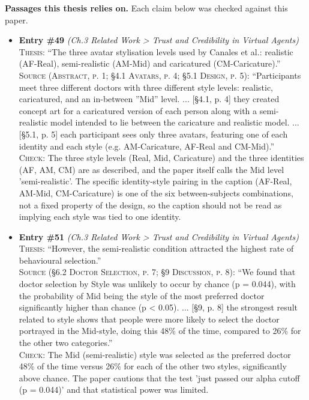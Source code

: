 \documentclass[11pt, a4paper]{article}
\begin{document}
\textbf{Passages this thesis relies on.} Each claim below was checked against this paper.
\begin{itemize}[leftmargin=1.2em,itemsep=4pt]
\item \textbf{Entry \#49} \textit{(Ch.3 Related Work > Trust and Credibility in Virtual Agents)}\\
\textsc{Thesis:} ``The three avatar stylisation levels used by Canales et al.: realistic (AF-Real), semi-realistic (AM-Mid) and caricatured (CM-Caricature).''\\
\textsc{Source (Abstract, p. 1; §4.1 Avatars, p. 4; §5.1 Design, p. 5):} ``Participants meet three different doctors with three different style levels: realistic, caricatured, and an in-between ”Mid” level. ... [§4.1, p. 4] they created concept art for a caricatured version of each person along with a semi-realistic model intended to lie between the caricature and realistic model. ... [§5.1, p. 5] each participant sees only three avatars, featuring one of each identity and each style (e.g. AM-Caricature, AF-Real and CM-Mid).''\\
\textsc{Check:} The three style levels (Real, Mid, Caricature) and the three identities (AF, AM, CM) are as described, and the paper itself calls the Mid level 'semi-realistic'. The specific identity-style pairing in the caption (AF-Real, AM-Mid, CM-Caricature) is one of the six between-subjects combinations, not a fixed property of the design, so the caption should not be read as implying each style was tied to one identity.
\item \textbf{Entry \#51} \textit{(Ch.3 Related Work > Trust and Credibility in Virtual Agents)}\\
\textsc{Thesis:} ``However, the semi-realistic condition attracted the highest rate of behavioural selection.''\\
\textsc{Source (§6.2 Doctor Selection, p. 7; §9 Discussion, p. 8):} ``We found that doctor selection by Style was unlikely to occur by chance (p = 0.044), with the probability of Mid being the style of the most preferred doctor significantly higher than chance (p < 0.05). ... [§9, p. 8] the strongest result related to style shows that people were more likely to select the doctor portrayed in the Mid-style, doing this 48\% of the time, compared to 26\% for the other two categories.''\\
\textsc{Check:} The Mid (semi-realistic) style was selected as the preferred doctor 48\% of the time versus 26\% for each of the other two styles, significantly above chance. The paper cautions that the test 'just passed our alpha cutoff (p = 0.044)' and that statistical power was limited.

\end{itemize}
\end{document}

